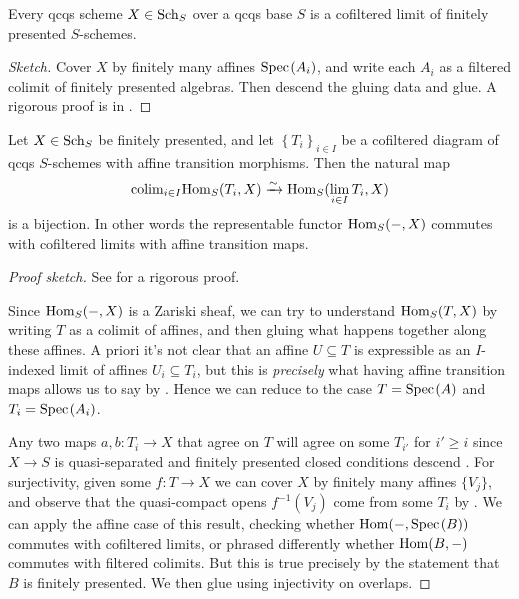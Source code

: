 \documentclass[11pt,openany]{book}
\begin{document}
\begin{proposition}\label{prop:every-scheme-cofiltered-limit-of-fp-schemes}
Every qcqs scheme $X\in \mathrm{Sch}_S$ over a qcqs base $S$ is a cofiltered limit of finitely presented $S$-schemes.
\end{proposition}
\begin{proof}[Sketch] Cover $X$ by finitely many affines $\text{Spec}\hspace{0.1em}(A_i)$, and write each $A_i$ as a filtered colimit of finitely presented algebras. Then descend the gluing data and glue. A rigorous proof is in \cite[09MV]{Stacks}.
\end{proof}


\begin{proposition}\label{prop:fp-scheme-commute-filtered-colimits}
Let $X\in\mathrm{Sch}_S$ be finitely presented, and let $\left\{ T_i \right\}_{i\in I}$ be a cofiltered diagram of qcqs $S$-schemes with affine transition morphisms. Then the natural map
\begin{align*}
    \mathrm{colim}_{i\in I}\mathrm{Hom}_S(T_i,X) \xrightarrow{\sim} \mathrm{Hom}_S(\lim_{i\in I}T_i,X)
\end{align*}
is a bijection. In other words the representable functor $\mathrm{Hom}_S(-,X)$ commutes with cofiltered limits with affine transition maps.
\end{proposition}
\begin{proof}[Proof sketch] See \cite[01ZC]{Stacks} for a rigorous proof.
    
Since $\mathrm{Hom}_S(-,X)$ is a Zariski sheaf, we can try to understand $\mathrm{Hom}_S(T,X)$ by writing $T$ as a colimit of affines, and then gluing what happens together along these affines. A priori it's not clear that an affine $U \subseteq T$ is expressible as an $I$-indexed limit of affines $U_i \subseteq T_i$, but this is \emph{precisely} what having affine transition maps allows us to say by . Hence we can reduce to the case $T= \text{Spec}\hspace{0.1em}(A)$ and $T_i = \text{Spec}\hspace{0.1em}(A_i)$.

Any two maps $a,b \colon T_i \to X$ that agree on $T$ will agree on some $T_{i'}$ for $i' \ge i$ since $X \to S$ is quasi-separated and finitely presented closed conditions descend \cite[01ZM]{Stacks}. For surjectivity, given some $f\colon T \to X$ we can cover $X$ by finitely many affines $\{V_j\}$, and observe that the quasi-compact opens $f^{-1}(V_j)$ come from some $T_i$ by \cite[01Z4]{Stacks}. We can apply the affine case of this result, checking whether $\mathrm{Hom}(-,\text{Spec}\hspace{0.1em}(B))$ commutes with cofiltered limits, or phrased differently whether $\mathrm{Hom}(B,-)$ commutes with filtered colimits. But this is true precisely by the statement that $B$ is finitely presented. We then glue using injectivity on overlaps.
\end{proof}
\end{document}
